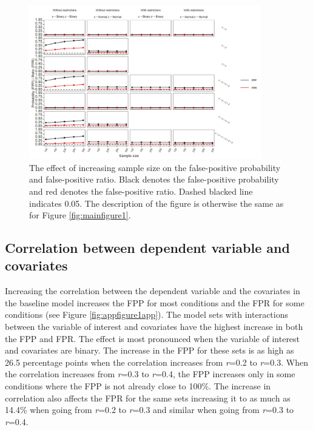 \begin{figure}[hbt!]
\includegraphics[width=0.9\textwidth]{R/Analysis/Result/Figures/Figure1D.jpeg}
\centering
\caption{The effect of increasing sample size on the false-positive probability and false-positive ratio. Black denotes the false-positive probability and red denotes the false-positive ratio. Dashed blacked line indicates 0.05. The description of the figure is otherwise the same as for Figure \ref{fig:mainfigure1}.}
\label{fig:mainfigure4}
\end{figure}

\subsection{Correlation between dependent variable and covariates}
Increasing the correlation between the dependent variable and the covariates in the baseline model increases the FPP for most conditions and the FPR for some conditions (see Figure \ref{fig:appfigure1app}). The model sets with interactions between the variable of interest and covariates have the highest increase in both the FPP and FPR. The effect is most pronounced when the variable of interest and covariates are binary. The increase in the FPP for these sets is as high as 26.5 percentage points when the correlation increases from \textit{r}=0.2 to \textit{r}=0.3. When the correlation increases from \textit{r}=0.3 to \textit{r}=0.4, the FPP increases only in some conditions where the FPP is not already close to 100\%. The increase in correlation also affects the FPR for the same sets increasing it to as much as 14.4\% when going from \textit{r}=0.2 to \textit{r}=0.3 and similar when going from \textit{r}=0.3 to \textit{r}=0.4. 